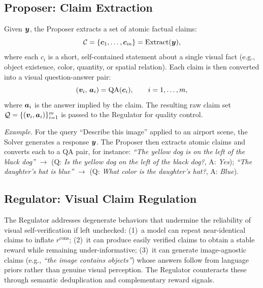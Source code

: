 \subsection{Proposer: Claim Extraction}
\label{sec:proposer}

Given ${\bm{y}}$, the Proposer extracts a set of atomic factual
claims:
\begin{equation}
    \mathcal{C} = \{{\bm{c}}_1, \ldots, {\bm{c}}_m\} = \text{Extract}({\bm{y}}),
\end{equation}
where each $c_i$ is a short, self-contained statement about a single visual
fact (e.g., object existence, color, quantity, or spatial relation).
Each claim is then converted into a visual question-answer pair:
\begin{equation}
    ({\bm{v}}_i,\, {\bm{a}}_i) = \text{QA}({\bm{c}}_i),
    \qquad i = 1, \ldots, m,
\end{equation}
where ${\bm{a}}_i$ is the answer implied by the claim.
The resulting raw claim set $\mathcal{Q} = \{({\bm{v}}_i, {\bm{a}}_i)\}_{i=1}^{m}$
is passed to the Regulator for quality control.

\smallskip
\noindent\textit{Example.}
For the query ``Describe this image'' applied to an airport scene, the Solver generates a response ${\bm{y}}$.
The Proposer then extracts atomic claims and converts each to a QA pair, for instance:
\textit{``The yellow dog is on the left of the black dog''} $\to$ (Q: \textit{Is the yellow dog on the left of the black dog?}, A: \textit{Yes});
\textit{``The daughter's hat is blue''} $\to$ (Q: \textit{What color is the daughter's hat?}, A: \textit{Blue}).


\subsection{Regulator: Visual Claim Regulation}
\label{sec:regulator}

The Regulator addresses degenerate behaviors that undermine the reliability of visual self-verification if left unchecked:
(1)~a model can repeat near-identical claims to inflate $r^{\text{cons}}$;
(2)~it can produce easily verified claims to obtain a stable reward while remaining under-informative;
(3)~it can generate image-agnostic claims (e.g., \textit{``the image contains objects''}) whose answers follow from language priors rather than genuine visual perception.
The Regulator counteracts these through semantic deduplication and complementary reward signals.

